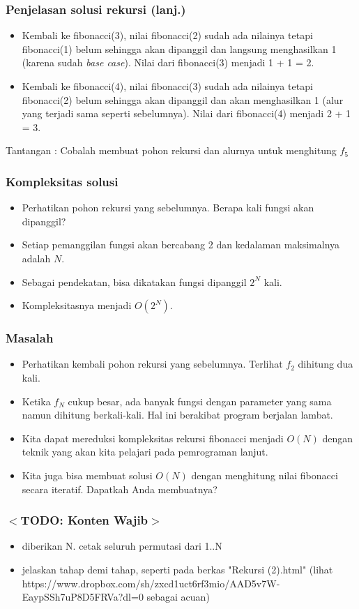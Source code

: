 \begin{frame}
\frametitle{Penjelasan solusi rekursi (lanj.)}
\begin {itemize}
  \item Kembali ke fibonacci(3), nilai fibonacci(2) sudah ada nilainya tetapi fibonacci(1) belum sehingga akan dipanggil dan langsung menghasilkan 1 (karena sudah \textit{base case}). Nilai dari fibonacci(3) menjadi 1 + 1 = 2.
  \item Kembali ke fibonacci(4), nilai fibonacci(3) sudah ada nilainya tetapi fibonacci(2) belum sehingga akan dipanggil dan akan menghasilkan 1 (alur yang terjadi sama seperti sebelumnya). Nilai dari fibonacci(4) menjadi 2 + 1 = 3.
\end{itemize}
Tantangan : Cobalah membuat pohon rekursi dan alurnya untuk menghitung $f_5$
\end{frame}

\begin{frame}
\frametitle{Kompleksitas solusi}
\begin {itemize}
   \item Perhatikan pohon rekursi yang sebelumnya. Berapa kali fungsi akan dipanggil?
   \item Setiap pemanggilan fungsi akan bercabang 2 dan kedalaman maksimalnya adalah $N$.
   \item Sebagai pendekatan, bisa dikatakan fungsi dipanggil $2^N$ kali.
   \item Kompleksitasnya menjadi $O(2^{N})$.
\end {itemize}
\end{frame}

\begin{frame}
\frametitle{Masalah}
\begin{itemize}
  \item Perhatikan kembali pohon rekursi yang sebelumnya. Terlihat $f_2$ dihitung dua kali.
  \item Ketika $f_N$ cukup besar, ada banyak fungsi dengan parameter yang sama namun dihitung berkali-kali. Hal ini berakibat program berjalan lambat.
  \item Kita dapat mereduksi kompleksitas rekursi fibonacci menjadi $O(N)$ dengan teknik yang akan kita pelajari pada pemrograman lanjut.
  \item Kita juga bisa membuat solusi $O(N)$ dengan menghitung nilai fibonacci secara iteratif. Dapatkah Anda membuatnya?
\end{itemize}
\end{frame}

\begin{frame}
\frametitle{$<$TODO: Konten Wajib$>$}
\begin{itemize}
  \item diberikan N. cetak seluruh permutasi dari 1..N
  \item jelaskan tahap demi tahap, seperti pada berkas "Rekursi (2).html" (lihat  https://www.dropbox.com/sh/zxcd1uct6rf3mio/AAD5v7W-EaypSSh7uP8D5FRVa?dl=0 sebagai acuan)
\end{itemize}
\end{frame}


